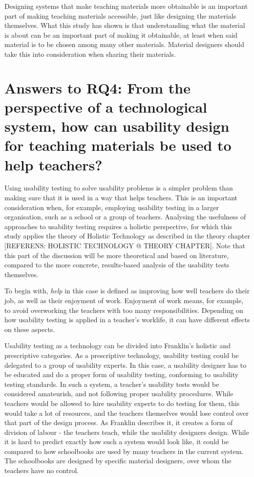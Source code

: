 Designing systems that make teaching materials more obtainable is an important part of making teaching materials accessible, just like designing the materials themselves. What this study has shown is that understanding what the material is about can be an important part of making it obtainable, at least when said material is to be chosen among many other materials. Material designers should take this into consideration when sharing their materials.

\section{Answers to RQ4: From the perspective of a technological system, how can usability design for teaching materials be used to help teachers?}

Using usability testing to solve usability problems is a simpler problem than making sure that it is used in a way that helps teachers. This is an important consideration when, for example, employing usability testing in a larger organisation, such as a school or a group of teachers. Analysing the usefulness of approaches to usability testing requires a holistic perspective, for which this study applies the theory of Holistic Technology as described in the theory chapter [REFERENS: HOLISTIC TECHNOLOGY @ THEORY CHAPTER]. Note that this part of the discussion will be more theoretical and based on literature, compared to the more concrete, results-based analysis of the usability tests themselves.

To begin with, \textit{help} in this case is defined as improving how well teachers do their job, as well as their enjoyment of work. Enjoyment of work means, for example, to avoid overworking the teachers with too many responsibilities. Depending on how usability testing is applied in a teacher's worklife, it can have different effects on these aspects.

Usability testing as a technology can be divided into Franklin's holistic and prescriptive categories. As a prescriptive technology, usability testing could be delegated to a group of usability experts. In this case, a usability designer has to be educated and do a proper form of usability testing, conforming to usability testing standards. In such a system, a teacher's usability tests would be considered amateurish, and not following proper usability procedures. While teachers would be allowed to hire usability experts to do testing for them, this would take a lot of resources, and the teachers themselves would lose control over that part of the design process. As Franklin describes it, it creates a form of division of labour - the teachers teach, while the usability designers design. While it is hard to predict exactly how such a system would look like, it could be compared to how schoolbooks are used by many teachers in the current system. The schoolbooks are designed by specific material designers, over whom the teachers have no control.

